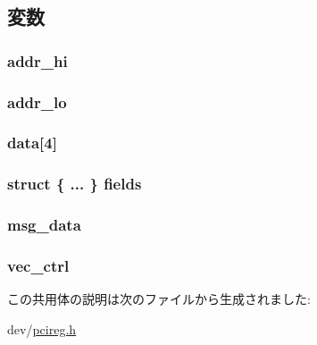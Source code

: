 \subsection{変数}
\hypertarget{unionMSIXTable_a0d084c842a04378b2848b82de24f1949}{
\subsubsection[{addr\_\-hi}]{ {\bf addr\_\-hi}}}
\label{unionMSIXTable_a0d084c842a04378b2848b82de24f1949}
\hypertarget{unionMSIXTable_a12565d96544eb26893006f674959b08a}{
\subsubsection[{addr\_\-lo}]{ {\bf addr\_\-lo}}}
\label{unionMSIXTable_a12565d96544eb26893006f674959b08a}
\hypertarget{unionMSIXTable_aba3ab3dadf10b1a00fa5fc4ee3857cf6}{
\subsubsection[{data}]{ {\bf data}\mbox{[}4\mbox{]}}}
\label{unionMSIXTable_aba3ab3dadf10b1a00fa5fc4ee3857cf6}
\hypertarget{unionMSIXTable_a0b20e1c936db55ce0cf40c9537fff4cf}{
\subsubsection[{fields}]{\setlength{\rightskip}{0pt plus 5cm}struct \{ ... \}   {\bf fields}}}
\label{unionMSIXTable_a0b20e1c936db55ce0cf40c9537fff4cf}
\hypertarget{unionMSIXTable_a9eac0dc114707ee8b932c89b5d5ca68f}{
\subsubsection[{msg\_\-data}]{ {\bf msg\_\-data}}}
\label{unionMSIXTable_a9eac0dc114707ee8b932c89b5d5ca68f}
\hypertarget{unionMSIXTable_ad014237a9bbb8e5880e4f52e909c272c}{
\subsubsection[{vec\_\-ctrl}]{ {\bf vec\_\-ctrl}}}
\label{unionMSIXTable_ad014237a9bbb8e5880e4f52e909c272c}


この共用体の説明は次のファイルから生成されました:\begin{DoxyCompactItemize}
\item 
dev/\hyperlink{pcireg_8h}{pcireg.h}\end{DoxyCompactItemize}
